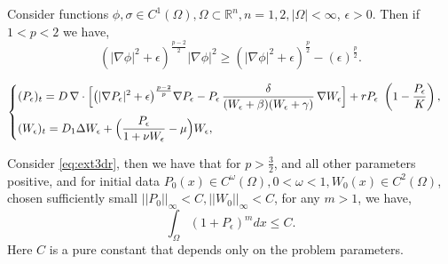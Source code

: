 \documentclass[10pt,a4paper]{amsart}
\begin{document}
\begin{lemma}
\label{lem:pc1aa}
    Consider functions $\phi, \sigma \in C^{1}(\Omega), \Omega \subset \mathbb{R}^{n}, n=1,2, |\Omega| < \infty$, $\epsilon > 0$. Then if $1< p <2$ we have,
    \begin{equation}
        (|\nabla \phi|^{2} + \epsilon)^{\frac{p-2}{2}}|\nabla \phi|^{2} \geq \left(|\nabla \phi|^{2}+\epsilon \right)^{\frac{p}{2}} - (\epsilon)^{\frac{p}{2}}.
\end{equation}



\end{lemma}

\begin{equation}\label{eq:ext3dr}
\begin{cases}
\displaystyle
(P_{\epsilon})_t = D\,\nabla \cdot
      \Bigl[\bigl(|\nabla P_{\epsilon}|^{2} + \epsilon \bigr)^{\frac{p-2}{p}}\nabla P_{\epsilon}
            - P_{\epsilon}\,\frac{\delta}{(W_{\epsilon}+\beta)(W_{\epsilon}+\gamma)}\, \nabla W_{\epsilon} \Bigr]
      + rP_{\epsilon}\ \left(1-\frac{P_{\epsilon}}{K}\right),
\\[10pt]
\displaystyle
(W_{\epsilon})_t = D_{1} \Delta W_{\epsilon} + \Bigl(\frac{P_{\epsilon}}{1+\nu W_{\epsilon}}-\mu\Bigr)W_{\epsilon},
\end{cases}
\end{equation}

\begin{lemma}
\label{lem:lpb}
Consider \eqref{eq:ext3dr}, then we have that for $p > \frac{3}{2}$, and all other parameters positive, and for initial data $P_{0}(x) \in C^{\omega}(\Omega), 0 < \omega <1, W_{0}(x) \in C^{2}(\Omega)$, chosen sufficiently small $||P_{0}||_{\infty} < C, ||W_{0}||_{\infty}<C$, for any $m>1$, we have,
\begin{equation}
    \int_{\Omega} (1+P_{\epsilon})^{m} dx \leq 
    C.
    \end{equation}
Here $C$ is a pure constant that depends only on the problem parameters.
   
    \end{lemma}
\end{document}
